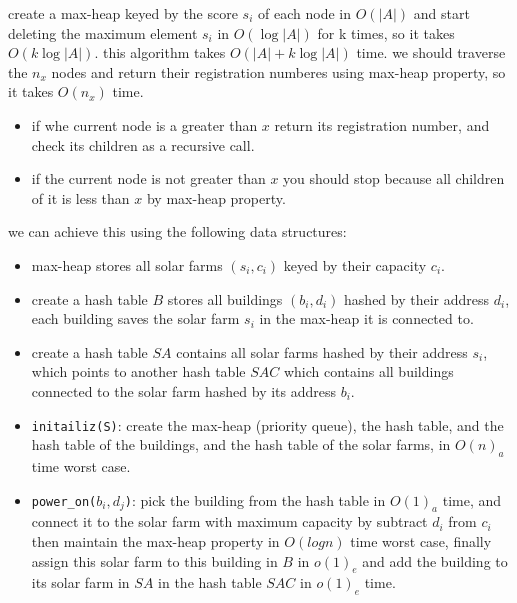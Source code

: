 \documentclass[12pt,twoside]{article}
\begin{document}
\begin{problems}
\newpage
\problem  %

\begin{problemparts}
\problempart %
  create a max-heap keyed by the score $s_i$ of each node in $O(|A|)$ and start
  deleting the maximum element $s_i$ in $O(\log{|A|})$ for k times, so it takes $O(k\log{|A|})$. 
  this algorithm takes $O(|A| + k\log{|A|})$ time.
\problempart %
we should traverse the $n_x$ nodes and return their registration numberes using max-heap property,
so it takes $O(n_x)$ time.
\begin{itemize}
  \item if whe current node is a greater than $x$ return its registration number, and check 
    its children as a recursive call.
  \item if the current node is not greater than $x$ you should stop because all children of it is 
    less than $x$ by max-heap property.
\end{itemize}
\end{problemparts}

\newpage
\problem  %
we can achieve this using the following data structures: 
\begin{itemize}
  \item max-heap stores all solar farms $(s_i, c_i)$ keyed by their capacity $c_i$.
    
  \item create a hash table $B$ stores all buildings $(b_i, d_i)$ hashed by their address $d_i$, each building 
    saves the solar farm $s_i$ in the max-heap it is connected to.
    
  \item create a hash table $SA$ contains all solar farms hashed by their address $s_i$, which points to 
    another hash table $SAC$ which contains all buildings connected to the solar farm hashed by its address $b_i$.
    
\end{itemize}

\begin{itemize}
\item {\tt initailiz(S)}: create the max-heap (priority queue), the hash table, and the hash table of 
  the buildings, and the hash table of the solar farms, in $O(n)_a$ time worst case.

\item {\tt power\_on($b_i, d_j$)}: pick the building from the hash table in $O(1)_a$ time, and connect it 
  to the solar farm with maximum capacity by subtract $d_i$ from $c_i$ then maintain the max-heap property
    in $O(log{n})$ time worst case, finally assign this solar farm to this building in $B$ 
    in $o(1)_e$ and add the building to its solar farm in $SA$ in the hash table $SAC$ in $o(1)_e$ time.


\end{itemize}
\end{problems}
\end{document}
